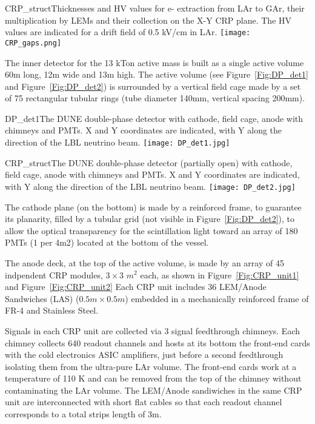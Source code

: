 \begin{cdrfigure}{CRP_struct}{Thicknesses and HV values for e- extraction from LAr to GAr, their multiplication by LEMs and their collection on the X-Y CRP plane. The HV values are indicated for a drift field of 0.5 kV/cm in LAr.}
\texttt{[image: CRP\_gaps.png]}
\end{cdrfigure}

The inner detector for the 13 kTon active mass is built as a single active volume 60m long, 12m wide and 13m high. The active volume (see Figure~\ref{Fig:DP_det1} and Figure~\ref{Fig:DP_det2}) is surrounded by a vertical field cage made by a set of 75 rectangular tubular rings (tube diameter 140mm, vertical spacing 200mm).

\begin{cdrfigure}{DP_det1}{The DUNE double-phase detector with cathode, field cage, anode with chimneys and PMTs. X and Y coordinates are indicated, with Y along the direction of the LBL neutrino beam.}
\texttt{[image: DP\_det1.jpg]}
\end{cdrfigure}

\begin{cdrfigure}{CRP_struct}{The DUNE double-phase detector (partially open) with cathode, field cage, anode with chimneys and PMTs. X and Y coordinates are indicated, with Y along the direction of the LBL neutrino beam.}
\texttt{[image: DP\_det2.jpg]}
\end{cdrfigure}

The cathode plane (on the bottom) is made by a reinforced frame, to guarantee its planarity, filled by a tubular grid (not visible in Figure~\ref{Fig:DP_det2}), to allow the optical transparency for the scintillation light toward an array of 180 PMTs (1 per 4m2) located at the bottom of the vessel.

The anode deck, at the top of the active volume, is made by an array of 45 indpendent CRP modules, $3\times3$ $m^2$ each, as shown in Figure~\ref{Fig:CRP_unit1} and Figure~\ref{Fig:CRP_unit2} Each CRP unit includes 36 LEM/Anode Sandwiches (LAS) ($0.5m\times 0.5m$) embedded in  a mechanically reinforced frame of FR-4 and Stainless Steel. 

Signals in each CRP unit are collected via 3 signal feedthrough chimneys. Each chimney collects 640 readout channels and hosts at its bottom the front-end cards with the cold electronics ASIC amplifiers, just before a second feedthrough isolating them from the ultra-pure LAr volume. The front-end cards work at a temperature of 110 K and can be removed from the top of the chimney without contaminating the LAr volume. The LEM/Anode sandiwiches in the same CRP unit are interconnected with short flat cables so that each readout channel corresponds to a total strips length of 3m.
  
